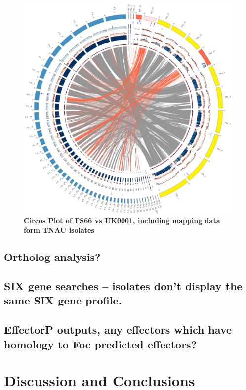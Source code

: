 \begin{figure}[htp!]
    \centering
    \includegraphics[width=15cm]{Figures/circos.png}
    \caption[Circos Plot of FS66 vs UK0001, including mapping data form TNAU isolates]{\textbf{Circos Plot of FS66 vs UK0001, including mapping data form TNAU isolates}}
    \label{TNAUCircos}
\end{figure}


\subsection{Ortholog analysis?}
\subsection{SIX gene searches – isolates don’t display the same SIX gene profile.}
\subsection{EffectorP outputs, any effectors which have homology to Foc predicted effectors?}



\section{Discussion and Conclusions}
